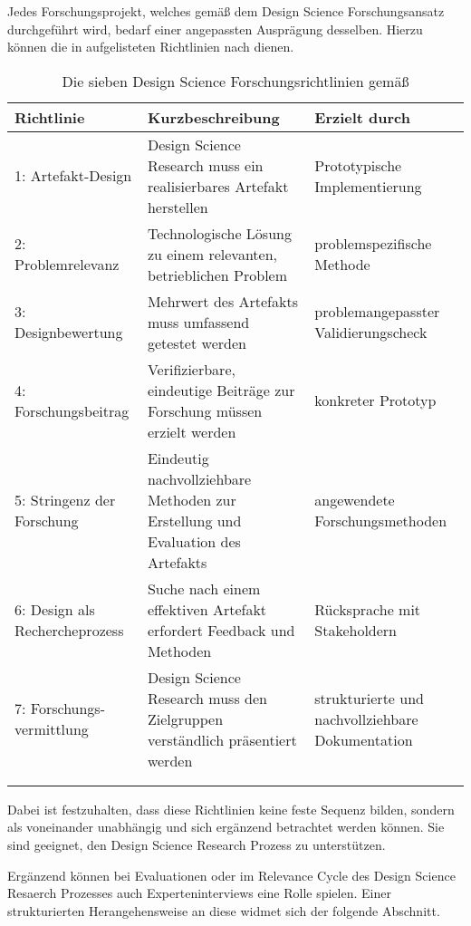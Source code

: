 Jedes Forschungsprojekt, welches gemäß dem Design Science Forschungsansatz durchgeführt wird,
bedarf einer angepassten Ausprägung desselben. Hierzu können die in 
aufgelisteten Richtlinien nach \textcite{Hevneretal2004} dienen.
%
{\small
\begin{longtable}{p{}p{}p{}}
\toprule
\textbf{Richtlinie} & \textbf{Kurzbeschreibung} & \textbf{Erzielt durch} \\
\midrule
1: Artefakt-Design & Design Science Research muss ein realisierbares Artefakt herstellen &
Prototypische Implementierung  \\*
\midrule
2: Problemrelevanz & Technologische Lösung zu einem relevanten, betrieblichen Problem &
problemspezifische Methode \\*
\midrule
3: Designbewertung & Mehrwert des Artefakts muss umfassend getestet werden & 
problemangepasster Validierungscheck  \\*
\midrule
4: Forschungsbeitrag & Verifizierbare, eindeutige Beiträge zur Forschung müssen erzielt werden &
konkreter Prototyp \\*
\midrule
5: Stringenz der\newline\phantom{5:} Forschung & Eindeutig nachvollziehbare Methoden zur
Erstellung und Evaluation des Artefakts & angewendete Forschungsmethoden  \\*
\midrule
6: Design als \newline\phantom{6:} Rechercheprozess & Suche nach einem effektiven Artefakt
erfordert Feedback und Methoden & Rücksprache mit Stakeholdern \\*
\midrule
7: Forschungs-\newline\phantom{7:} vermittlung & Design Science Research muss den Zielgruppen verständlich präsentiert werden &
strukturierte und nachvollziehbare Dokumentation \\*
\bottomrule \\
\caption{Die sieben Design Science Forschungsrichtlinien gemäß \textcite{Hevneretal2004}}
\label{tab:DSResearchGuidelines}
\end{longtable}
} %
%
Dabei ist festzuhalten, dass diese Richtlinien keine feste Sequenz bilden, sondern als
voneinander unabhängig und sich ergänzend betrachtet werden können. Sie sind geeignet, den
Design Science Research Prozess zu unterstützen.

Ergänzend können bei Evaluationen oder im Relevance Cycle des Design Science Resaerch Prozesses
auch Experteninterviews eine Rolle spielen. Einer strukturierten Herangehensweise an diese widmet
sich der folgende Abschnitt.
%
